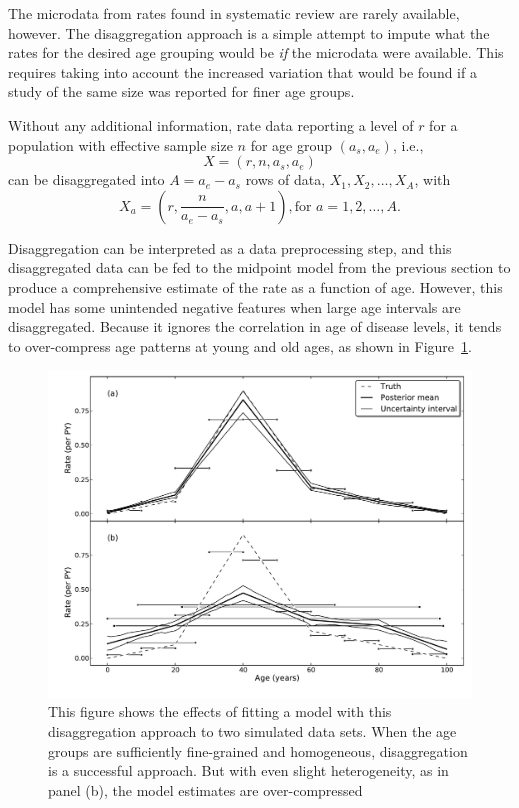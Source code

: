 The microdata from rates found in systematic review are rarely
available, however. The disaggregation approach is a simple attempt to
impute what the rates for the desired age grouping would be \emph{if}
the microdata were available. This requires taking into account the
increased variation that would be found if a study of the same size
was reported for finer age groups.

Without any additional information, rate data reporting a level of $r$
for a population with effective sample size $n$ for age group $(a_s,a_e)$, i.e.,
\[
X = (r, n, a_s, a_e)
\]
can be disaggregated into $A = a_e-a_s$ rows of
data, $X_1, X_2, \ldots, X_A$, with 
\[ 
X_a = \left(r, \frac{n}{a_e-a_s}, a, a+1\right), \text{for } a=1,2,\ldots,A. 
\]

Disaggregation can be interpreted as a data preprocessing step, and
this disaggregated data can be fed to the midpoint model from the
previous section to produce a comprehensive estimate of the rate as a
function of age. However, this model has some unintended negative
features when large age intervals are disaggregated.  Because it
ignores the correlation in age of disease levels, it tends to
over-compress age patterns at young and old ages, as shown in Figure~\ref{disagg}.

\begin{figure}[h]
\begin{center}
\includegraphics[width=\textwidth]{age_group_disagg.pdf}
\caption{This figure shows the effects of fitting a model with this
  disaggregation approach to two simulated data sets.  When the age groups are sufficiently
  fine-grained and homogeneous, disaggregation is a successful
  approach.  But with even slight heterogeneity, as in panel (b), the model
  estimates are over-compressed}
\label{disagg}
\end{center}
\end{figure}


